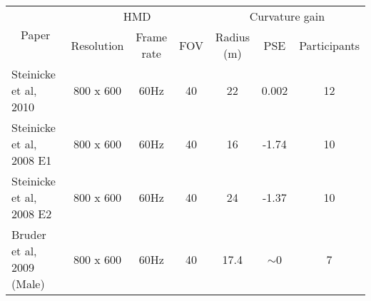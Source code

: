 \begin{table}[]
\centering
\begin{tabular}{|l|ccc|ccc|}
\hline
\multicolumn{1}{|c|}{\multirow{2}{*}{Paper}} & \multicolumn{3}{c|}{HMD}                                                                                                                                                   & \multicolumn{3}{c|}{Curvature gain}                                                                                                                             \\ \cline{2-7} 
\multicolumn{1}{|c|}{}                       & Resolution                                                      & Frame rate                                          & FOV                                                & Radius (m)                                                                                                                             & PSE     & Participants \\ \hline
Steinicke et al, 2010\cite{steinicke2010estimation}                        & 800 x 600                                                       & 60Hz                                                & 40                                                 & 22                                                                                                                                     & 0.002   & 12           \\ \hline
Steinicke et al, 2008\cite{steinicke2008analyses} E1                           & 800 x 600                                                       & 60Hz                                                & 40                                                 & 16                                                                                                                                     & -1.74   & 10           \\ \hline
Steinicke et al, 2008\cite{steinicke2008analyses} E2                           & 800 x 600                                                       & 60Hz                                                & 40                                                 & 24                                                                                                                                     & -1.37   & 10           \\ \hline
Bruder et al, 2009\cite{bruder2009impact} (Male)                          & 800 x 600                                                       & 60Hz                                                & 40                                                 & 17.4                                                                                                                                   & $\sim$0 & 7            \\ \hline

\end{tabular}
\end{table}
